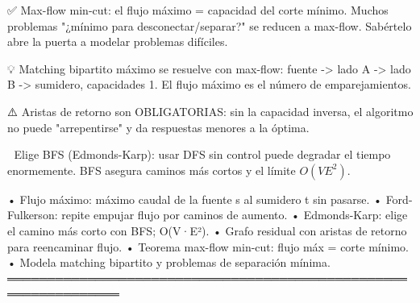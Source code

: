 \begin{dsaentrevistas}

✅ Max-flow min-cut: el flujo máximo = capacidad del corte mínimo. Muchos
   problemas "¿mínimo para desconectar/separar?" se reducen a max-flow.
   Sabértelo abre la puerta a modelar problemas difíciles.

💡 Matching bipartito máximo se resuelve con max-flow: fuente -> lado A
   -> lado B -> sumidero, capacidades 1. El flujo máximo es el número de
   emparejamientos.

⚠️ Aristas de retorno son OBLIGATORIAS: sin la capacidad inversa, el
   algoritmo no puede "arrepentirse" y da respuestas menores a la óptima.

🔑 Elige BFS (Edmonds-Karp): usar DFS sin control puede degradar el
   tiempo enormemente. BFS asegura caminos más cortos y el límite
   $O(VE^2)$.

\end{dsaentrevistas}

\begin{dsaresumen}

• Flujo máximo: máximo caudal de la fuente s al sumidero t sin pasarse.
• Ford-Fulkerson: repite empujar flujo por caminos de aumento.
• Edmonds-Karp: elige el camino más corto con BFS; O(V·E²).
• Grafo residual con aristas de retorno para reencaminar flujo.
• Teorema max-flow min-cut: flujo máx = corte mínimo.
• Modela matching bipartito y problemas de separación mínima.
════════════════════════════════════════════════════════════════

\end{dsaresumen}
